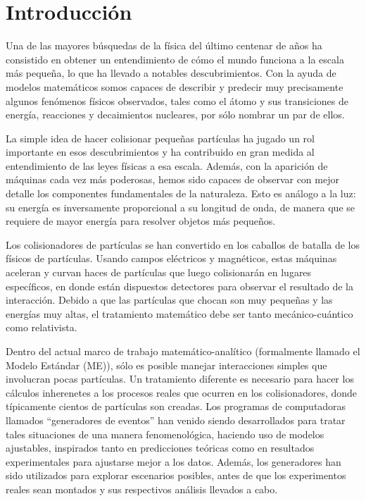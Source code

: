 \chapter*{Introducción}
\label{sec:introduction}

Una de las mayores búsquedas de la física del último centenar de años ha consistido en obtener un entendimiento de cómo el mundo funciona a la escala más pequeña, lo que ha llevado a notables descubrimientos. Con la ayuda de modelos matemáticos somos capaces de describir y predecir muy precisamente algunos fenómenos físicos observados, tales como el átomo y sus transiciones de energía, reacciones y decaimientos nucleares, por sólo nombrar un par de ellos.

La simple idea de hacer colisionar pequeñas partículas ha jugado un rol importante en esos descubrimientos y ha contribuido en gran medida al entendimiento de las leyes físicas a esa escala. Además, con la aparición de máquinas cada vez más poderosas, hemos sido capaces de observar con mejor detalle los componentes fundamentales de la naturaleza. Esto es análogo a la luz: su energía es inversamente proporcional a su longitud de onda, de manera que se requiere de mayor energía para resolver objetos más pequeños.

Los colisionadores de partículas se han convertido en los caballos de batalla de los físicos de partículas. Usando campos eléctricos y magnéticos, estas máquinas aceleran y curvan haces de partículas que luego colisionarán en lugares específicos, en donde están dispuestos detectores para observar el resultado de la interacción. Debido a que las partículas que chocan son muy pequeñas y las energías muy altas, el tratamiento matemático debe ser tanto mecánico-cuántico como relativista.

Dentro del actual marco de trabajo matemático-analítico (formalmente llamado el Modelo Estándar (ME)), sólo es posible manejar interacciones simples que involucran pocas partículas. Un tratamiento diferente es necesario para hacer los cálculos inherenetes a los procesos reales que ocurren en los colisionadores, donde típicamente cientos de partículas son creadas. Los programas de computadoras llamados ``generadores de eventos'' han venido siendo desarrollados para tratar tales situaciones de una manera fenomenológica, haciendo uso de modelos ajustables, inspirados tanto en predicciones teóricas como en resultados experimentales para ajustarse mejor a los datos. Además, los generadores han sido utilizados para explorar escenarios posibles, antes de que los experimentos reales sean montados y sus respectivos análisis llevados a cabo.

